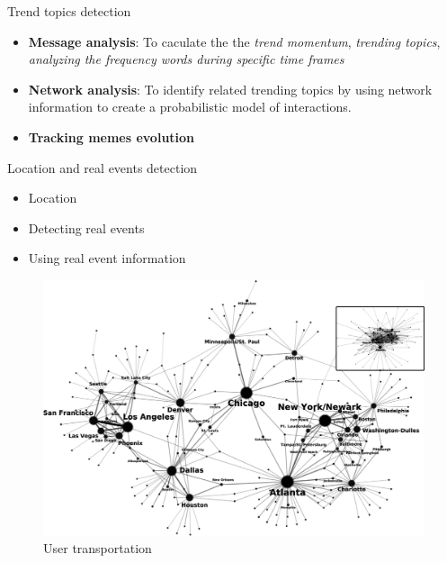\documentclass[8pt]{beamer}
\begin{document}
  \begin{frame}{Trend topics detection}
  
    \begin{itemize}
      \item \textbf{Message analysis}: To caculate the the \textit{trend momentum}, \textit{trending topics}, \textit{analyzing the frequency words during specific time frames}
      
      \item \textbf{Network analysis}: To identify related trending topics by using network information to create a probabilistic model of interactions.
      
      \item \textbf{Tracking memes evolution}
    \end{itemize}
    
    
  \end{frame}

  \begin{frame}{Location and real events detection}
  	\vfill
    \begin{itemize}
      \item Location
      \item Detecting real events
      \item Using real event information
    \end{itemize}
    
    \vfill
    \begin{figure}
    	\includegraphics[scale=0.2]{asset/4-Figure2-1.png}
    	\caption{User transportation}
    \end{figure}
  \end{frame}
\end{document}
